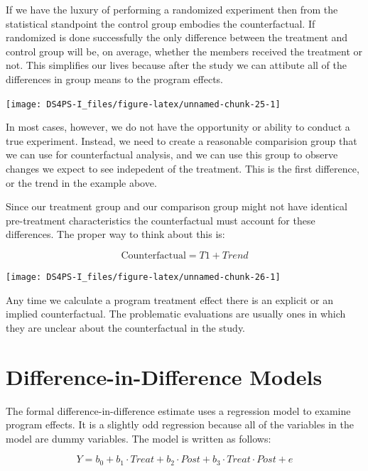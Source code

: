 \documentclass[]{book}
\theoremstyle{definition}
\theoremstyle{definition}
\theoremstyle{definition}
\theoremstyle{remark}
\begin{document}
If we have the luxury of performing a randomized experiment then from
the statistical standpoint the control group embodies the
counterfactual. If randomized is done successfully the only difference
between the treatment and control group will be, on average, whether the
members received the treatment or not. This simplifies our lives because
after the study we can attibute all of the differences in group means to
the program effects.

\begin{center}\texttt{[image: DS4PS-I\_files/figure-latex/unnamed-chunk-25-1]} \end{center}

In most cases, however, we do not have the opportunity or ability to
conduct a true experiment. Instead, we need to create a reasonable
comparision group that we can use for counterfactual analysis, and we
can use this group to observe changes we expect to see indepedent of the
treatment. This is the first difference, or the trend in the example
above.

Since our treatment group and our comparison group might not have
identical pre-treatment characteristics the counterfactual must account
for these differences. The proper way to think about this is:

\[ \textrm{Counterfactual} = T1 + Trend \]

\begin{center}\texttt{[image: DS4PS-I\_files/figure-latex/unnamed-chunk-26-1]} \end{center}

Any time we calculate a program treatment effect there is an explicit or
an implied counterfactual. The problematic evaluations are usually ones
in which they are unclear about the counterfactual in the study.

\hypertarget{difference-in-difference-models-1}{%
\section{Difference-in-Difference
Models}\label{difference-in-difference-models-1}}

The formal difference-in-difference estimate uses a regression model to
examine program effects. It is a slightly odd regression because all of
the variables in the model are dummy variables. The model is written as
follows:

\[ Y = b_{0} + b_{1} \cdot Treat + b_{2} \cdot Post + b_{3} \cdot Treat \cdot Post + e \]
\end{document}
